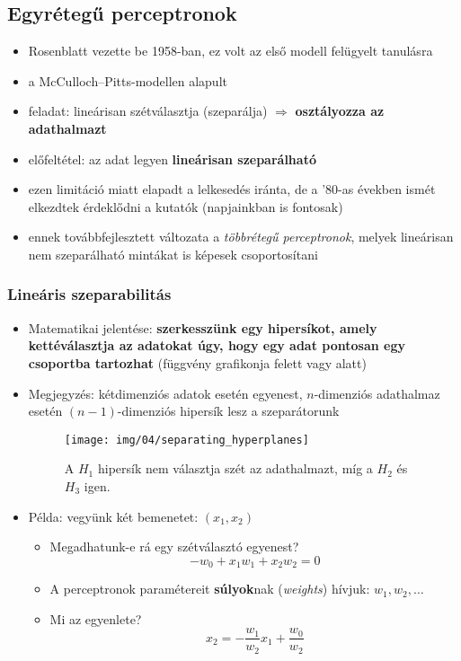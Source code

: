 \documentclass[a4paper, 11pt]{article}
\begin{document}
\subsection{Egyrétegű perceptronok}

\begin{itemize}
	\item Rosenblatt vezette be 1958-ban, ez volt az első modell felügyelt tanulásra
	\item a McCulloch--Pitts-modellen alapult 
	\item feladat: lineárisan szétválasztja (szeparálja) $\Longrightarrow$ \textbf{osztályozza az adathalmazt}
	\item előfeltétel: az adat legyen \textbf{lineárisan szeparálható}
	\item ezen limitáció miatt elapadt a lelkesedés iránta, de a '80-as években ismét elkezdtek érdeklődni a kutatók (napjainkban is fontosak)
	\item ennek továbbfejlesztett változata a \textit{többrétegű perceptronok}, melyek lineárisan nem szeparálható mintákat is képesek csoportosítani
\end{itemize}

\subsubsection{Lineáris szeparabilitás}

\begin{itemize}
	\item Matematikai jelentése: \textbf{szerkesszünk egy hipersíkot, amely kettéválasztja az adatokat úgy, hogy egy adat pontosan egy csoportba tartozhat} (függvény grafikonja felett vagy alatt)
	\item Megjegyzés: kétdimenziós adatok esetén egyenest, $n$-dimenziós adathalmaz esetén $(n-1)$-dimenziós hipersík lesz a szeparátorunk
	\begin{figure}[h!]
		\centering
		\texttt{[image: img/04/separating\_hyperplanes]}
		\caption{A $H_1$ hipersík nem választja szét az adathalmazt, míg a $H_2$ és $H_3$ igen.}
	\end{figure}
	\item Példa: vegyünk két bemenetet: $(x_1,x_2)$ 
	\begin{itemize}
		\item Megadhatunk-e rá egy szétválasztó egyenest? %
		\[-w_0 + x_1 w_1 + x_2 w_2 = 0\]
		\item A perceptronok paramétereit \textbf{súlyok}nak (\textit{weights}) hívjuk: $w_1, w_2, \dots$
		\item Mi az egyenlete? %
		\[x_2 = - \dfrac{w_1}{w_2} x_1 + \dfrac{w_0}{w_2}\]
	\end{itemize}
\end{itemize}
\end{document}

